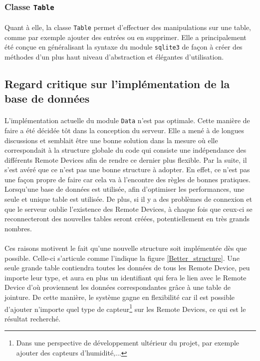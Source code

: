 \documentclass[11pt,a4paper,11pt]{report}
\begin{document}
\subsubsection{Classe \texttt{Table}}
\paragraph*{}
	Quant à elle, la classe \texttt{Table} permet d'effectuer des manipulations sur une table, comme par exemple ajouter des entrées ou en supprimer. Elle a principalement été conçue en généralisant la syntaxe du module \texttt{sqlite3} de façon à créer des méthodes d'un plus haut niveau d'abstraction et élégantes d'utilisation.
    
\subsection{Regard critique sur l'implémentation de la base de données}
\paragraph*{}
	L'implémentation actuelle du module \texttt{Data} n'est pas optimale. Cette manière de faire a été décidée tôt dans la conception du serveur. Elle a mené à de longues discussions et semblait être une bonne solution dans la mesure où elle correspondait à la structure globale du code qui consiste une indépendance des différents Remote Devices afin de rendre ce dernier plus flexible. Par la suite, il s'est avéré que ce n'est pas une bonne structure à adopter. En effet, ce n'est pas une façon propre de faire car cela va à l'encontre des règles de bonnes pratiques. Lorsqu'une base de données est utilisée, afin d'optimiser les performances, une seule et unique table est utilisée. De plus, si il y a des problèmes de connexion et que le serveur oublie l'existence des Remote Devices, à chaque fois que ceux-ci se reconnecteront des nouvelles tables seront créées, potentiellement en très grands nombres.
    
\paragraph*{}
	Ces raisons motivent le fait qu'une nouvelle structure soit implémentée dès que possible. Celle-ci s'articule comme l'indique la figure \ref{Better_structure}. Une seule grande table contiendra toutes les données de tous les Remote Device, peu importe leur type, et aura en plus un identifiant qui fera le lien avec le Remote Device d'où proviennent les données correspondantes grâce à une table de jointure. De cette manière, le système gagne en flexibilité car il est possible d'ajouter n'importe quel type de capteur\footnote{Dans une perspective de développement ultérieur du projet, par exemple ajouter des capteurs d'humidité,...} sur les Remote Devices, ce qui est le résultat recherché.
    
\end{document}
